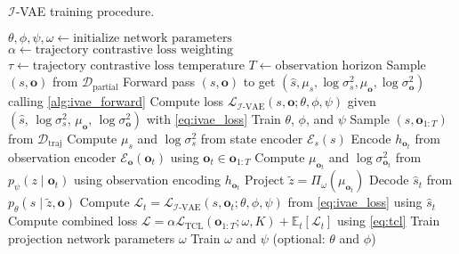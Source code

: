 \begin{algorithm}[H]
    \caption{$\mathcal{I}$-VAE training procedure.}
    \label{alg:ivae_training}
    \begin{algorithmic}[1]
    \Require $\theta, \phi, \psi, \omega \leftarrow \text{initialize network parameters}$
    \Require $\alpha \leftarrow \text{trajectory contrastive loss weighting}$
    \Require $\tau \leftarrow \text{trajectory contrastive loss temperature}$
    \Require $T \leftarrow \text{observation horizon}$
        \State Sample $(s, \mathbf{o})$ from $\mathcal{D}_\text{partial}$
        \State Forward pass $(s, \mathbf{o})$ to get $(\hat{s}, \mu_s, \log \sigma^2_s,\mu_\mathbf{o},\log \sigma^2_\mathbf{o})$ calling \cref{alg:ivae_forward}
        \State Compute loss $\mathcal{L}_{\mathcal{I}\text{-VAE}}(s, \mathbf{o}; \theta, \phi, \psi)$ given $(\hat{s},\, \log \sigma^2_s,\, \mu_\mathbf{o},\, \log \sigma^2_\mathbf{o})$ with \cref{eq:ivae_loss}
        \State Train $\theta$, $\phi$, and $\psi$
    \EndFor
        \State Sample $(s, \mathbf{o}_{1:T})$ from $\mathcal{D}_\text{traj}$
        \State Compute $\mu_s$ and $\log \sigma^2_s$ from state encoder $\mathcal{E}_s(s)$
            \State Encode $h_{\mathbf{o}_t}$ from observation encoder $\mathcal{E}_\mathbf{o}(\mathbf{o}_t)$ using $\mathbf{o}_t \in \mathbf{o}_{1:T}$
            \State Compute $\mu_{\mathbf{o}_t}$ and $\log \sigma^2_{\mathbf{o}_t}$ from $p_\psi(z \mid \mathbf{o}_t)$ using observation encoding $h_{\mathbf{o}_t}$
            \State Project $\tilde{z} = \Pi_\omega(\mu_{\mathbf{o}_t})$
            \State Decode $\hat{s}_t$ from $p_\theta(s \mid \tilde{z}, \mathbf{o})$
            \State Compute $\mathcal{L}_t = \mathcal{L}_{\mathcal{I}\text{-VAE}}(s, \mathbf{o}_t; \theta, \phi, \psi)$ from \cref{eq:ivae_loss} using $\hat{s}_t$
        \EndFor
        \State Compute combined loss $\mathcal{L} = \alpha \mathcal{L}_\text{TCL}(\mathbf{o}_{1:T}; \omega, K) + \mathbb{E}_t[\mathcal{L}_t]$ using \cref{eq:tcl}
            \State Train projection network parameters $\omega$
        \Else
            \State Train $\omega$ and $\psi$ (optional: $\theta$ and $\phi$)
        \EndIf
    \EndFor
    \end{algorithmic}
\end{algorithm}
